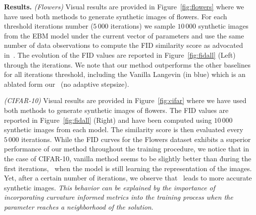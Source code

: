 \documentclass{article} %
\begin{document}
\textbf{Results.} 
\textit{(Flowers)} \hspace{0.05in} Visual results are provided in Figure~\ref{fig:flowers} where we have used both methods to generate synthetic images of flowers.
For each threshold iterations number ($5\,000$ iterations) we sample $10\,000$ synthetic images from the EBM model under the current vector of parameters and use the same number of data observations to compute the FID similarity score as advocated in~\citet{heusel2017gans}.
The evolution of the FID values are reported in Figure~\ref{fig:fidall} (Left) through the iterations.
We note that our method outperforms the other baselines for all iterations threshold, including the Vanilla Langevin (in blue) which is an ablated form our \algo\ (no adaptive stepsize).




\textit{(CIFAR-10)} \hspace{0.05in} Visual results are provided in Figure~\ref{fig:cifar} where we have used both methods to generate synthetic images of flowers.
The FID values are reported in Figure~\ref{fig:fidall} (Right) and have been computed using $10\,000$ synthetic images from each model.
The similarity score is then evaluated every $5\,000$ iterations. 
While the FID curves for the Flowers dataset exhibits a superior performance of our method throughout the training procedure, we notice that in the case of CIFAR-10, vanilla method seems to be slightly better than \algo\. during the first iterations, \ie\ when the model is still learning the representation of the images.
Yet, after a certain number of iterations, we observe that \algo\ leads to more accurate synthetic images.
\emph{This behavior can be explained by the importance of incorporating curvature informed metrics into the training process when the parameter reaches a neighborhood of the solution}.
\end{document}
